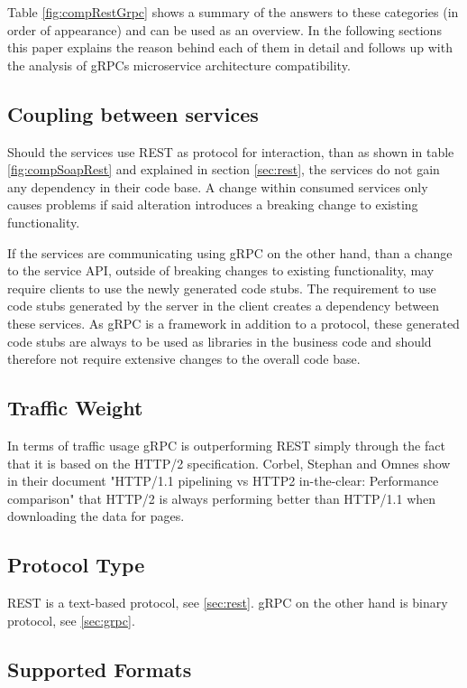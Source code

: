 \documentclass[conference]{IEEEtran}
\begin{document}
Table \ref{fig:compRestGrpc} shows a summary of the answers to these categories (in order of appearance) and can be used as an overview. In the following sections this paper explains the reason behind each of them in detail and follows up with the analysis of gRPCs microservice architecture compatibility.

\subsection{Coupling between services}

Should the services use REST as protocol for interaction, than as shown in table \ref{fig:compSoapRest} and explained in section \ref{sec:rest}, the services do not gain any dependency in their code base. A change within consumed services only causes problems if said alteration introduces a breaking change to existing functionality.

If the services are communicating using gRPC on the other hand, than a change to the service API, outside of breaking changes to existing functionality, may require clients to use the newly generated code stubs. The requirement to use code stubs generated by the server in the client creates a dependency between these services. As gRPC is a framework in addition to a protocol, these generated code stubs are always to be used as libraries in the business code and should therefore not require extensive changes to the overall code base.

\subsection{Traffic Weight}

In terms of traffic usage gRPC is outperforming REST simply through the fact that it is based on the HTTP/2 specification. Corbel, Stephan and Omnes show in their document "HTTP/1.1 pipelining vs HTTP2 in-the-clear: Performance comparison" \cite{7745823} that HTTP/2 is always performing better than HTTP/1.1 when downloading the data for pages.

\subsection{Protocol Type}

REST is a text-based protocol, see \ref{sec:rest}. gRPC on the other hand is binary protocol, see \ref{sec:grpc}.

\subsection{Supported Formats}
\end{document}
